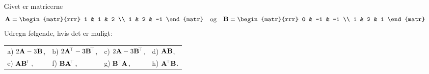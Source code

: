 \begin{exercise}
Givet er matricerne
\begin{equation}
\mA =\begin{matr}{rrr} 1 & 1 & 2 \\ 1 & 2 & -1 \end{matr} \quad \mathrm{og} \quad \mB = \begin{matr}{rrr} 0 & -1 & -1 \\ 1 & 2 & 1 \end{matr}
\end{equation}
Udregn følgende, hvis det er muligt:
\begin{center}
\begin{tabular}{llll}
a) $ 2\mathbf{A}-3\mathbf{B} $, & b) $ 2\mathbf{A}\hspace*{-.6mm}^{\top} - 3 \mathbf{B}\hspace*{-.6mm}^{\top} $, & c) $ 2\mathbf{A} - 3 \mathbf{B}\hspace*{-.6mm}^{\top} $, & d) $ \mathbf{A}\mathbf{B} $, \medskip \\
e) $ \mathbf{A}\mathbf{B}\hspace*{-.6mm}^{\top} $, & f) $ \mathbf{B}\mathbf{A}\hspace*{-.6mm}^{\top} $, & g) $ \mathbf{B}\hspace*{-.6mm}^{\top}\mathbf{A} $, & h) $ \mathbf{A}\hspace*{-.6mm}^{\top}\mathbf{B} $.
\end{tabular}
\end{center}
\end{exercise}

